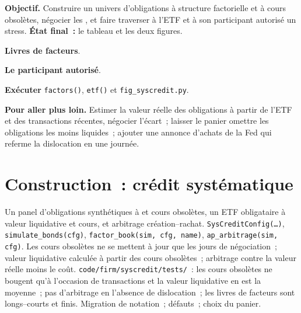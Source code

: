 \begin{tutorial}
\textbf{Objectif.} Construire un univers d'obligations à structure factorielle et à cours obsolètes, négocier les , et faire traverser à l'ETF et à son participant autorisé
un stress. \textbf{État final~:} le tableau et les deux figures.
\begin{tutsteps}
\item \textbf{Livres de facteurs}.
\label{lst:s2:systematic-credit-and-bond-etf-arbitrage:factors}
\item \textbf{Le participant autorisé}.
\label{lst:s2:systematic-credit-and-bond-etf-arbitrage:ap}
\item \textbf{Exécuter} \texttt{factors()}, \texttt{etf()} et \texttt{fig\_syscredit.py}.
\end{tutsteps}
\textbf{Pour aller plus loin.} Estimer la valeur réelle des obligations à partir de l'ETF et des transactions récentes, négocier l'écart~; laisser le panier omettre les
obligations les moins liquides~; ajouter une annonce d'achats de la Fed qui referme la dislocation en une journée.
\end{tutorial}

\section{Construction~: crédit systématique}\label{bld:s2:systematic-credit-and-bond-etf-arbitrage:syscredit}

\begin{build}
 Un panel d'obligations synthétiques à  et cours obsolètes, un ETF obligataire à valeur liquidative et cours, et arbitrage création--rachat.
 \texttt{SysCreditConfig(\dots)}, \texttt{simulate\_bonds(cfg)}, \texttt{factor\_book(sim, cfg, name)},
\texttt{ap\_arbitrage(sim, cfg)}.
 Les cours obsolètes ne se mettent à jour que les jours de négociation~; valeur liquidative calculée à partir des cours obsolètes~; arbitrage contre la valeur réelle moins le coût.
 \texttt{code/firm/syscredit/tests/}~: les cours obsolètes ne bougent qu'à l'occasion de transactions et la valeur liquidative en est la moyenne~; pas d'arbitrage en l'absence de
dislocation~; les livres de facteurs sont longs--courts et finis.
 Migration de notation~; défauts~; choix du panier.
\end{build}

